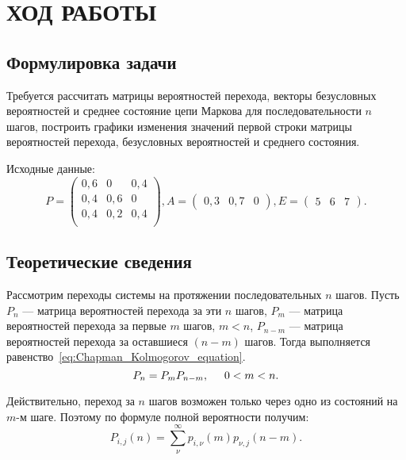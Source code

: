 \section{ХОД РАБОТЫ}

\subsection{Формулировка задачи}

Требуется рассчитать матрицы вероятностей перехода, векторы безусловных вероятностей
и среднее состояние цепи Маркова для последовательности $ n $ шагов,
построить графики изменения значений первой строки матрицы вероятностей перехода,
безусловных вероятностей и среднего состояния.

Исходные данные:
\begin{equation*}
P = \begin{pmatrix}
      0{,}6 & 0 & 0{,}4 \\
      0{,}4 & 0{,}6 & 0 \\
      0{,}4 & 0{,}2 & 0{,}4 \\
    \end{pmatrix},
A = \begin{pmatrix}
      0{,}3 & 0{,}7 & 0
    \end{pmatrix},
E = \begin{pmatrix}
      5 & 6 & 7
    \end{pmatrix}.
\end{equation*}


\subsection{Теоретические сведения}

Рассмотрим переходы системы на протяжении последовательных $ n $ шагов.
Пусть $ P_n $ --- матрица вероятностей перехода за эти $ n $ шагов,
$ P_m $ --- матрица вероятностей перехода за первые $ m $ шагов, $ m < n $,
$ P_{n-m} $ --- матрица вероятностей перехода за оставшиеся $ (n-m) $ шагов.
Тогда выполняется равенство~\ref{eq:Chapman_Kolmogorov_equation}.
\begin{equation}
\label{eq:Chapman_Kolmogorov_equation}
  P_n = P_m P_{n-m}, \hspace{5mm} 0 < m < n.
\end{equation}

Действительно, переход за $ n $ шагов возможен только через одно из состояний
на $ m $-м шаге. Поэтому по формуле полной вероятности получим:
\begin{equation*}
  P_{i,j}(n) = \sum\limits_{\nu}^{\infty} p_{i,\nu}(m) p_{\nu,j}(n-m).
\end{equation*}

